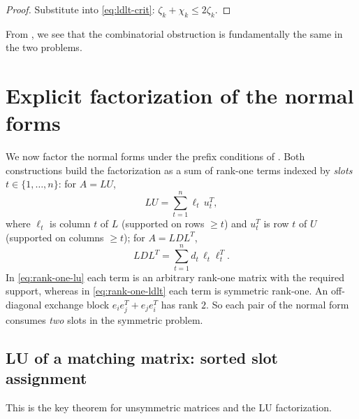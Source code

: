 \documentclass[preprint,12pt]{elsarticle}
\theoremstyle{plain}
\theoremstyle{nonumberplain}
\newtheorem{proof}{Proof}
\numberwithin{equation}{section}
\numberwithin{theorem}{section}
\begin{document}
\begin{proof}
  Substitute  into \cref{eq:ldlt-crit}:
  $\zeta_k + \chi_k \le 2 \zeta_k$.
\end{proof}

\begin{remark}\label{rem:comb-dictionary}
  From , we see that the combinatorial obstruction is fundamentally the same in the two problems.
\end{remark}

\section{Explicit factorization of the normal forms}\label{sec:explicit}

We now factor the normal forms under the prefix conditions of .  Both constructions build the factorization as a sum of rank-one terms indexed by \emph{slots} $t \in \{1, \ldots, n\}$: for $A = LU$,
\begin{equation}\label{eq:rank-one-lu}
  LU = \sum_{t=1}^{n} \ell_t \, u_t^T,
\end{equation}
where $\ell_t$ is column $t$ of $L$ (supported on rows $\ge t$) and $u_t^T$ is row $t$ of $U$ (supported on columns $\ge t$); for $A = LDL^T$,
\begin{equation}\label{eq:rank-one-ldlt}
  LDL^T = \sum_{t=1}^{n} d_t \, \ell_t \ell_t^T .
\end{equation}
In \cref{eq:rank-one-lu} each term is an arbitrary rank-one matrix with the required support, whereas in \cref{eq:rank-one-ldlt} each term is symmetric rank-one.  An off-diagonal exchange block $e_i e_j^T + e_j e_i^T$ has rank $2$. So each pair of the normal form consumes \emph{two} slots in the symmetric problem.

\subsection{LU of a matching matrix: sorted slot assignment}

This is the key theorem for unsymmetric matrices and the LU factorization.
\end{document}
